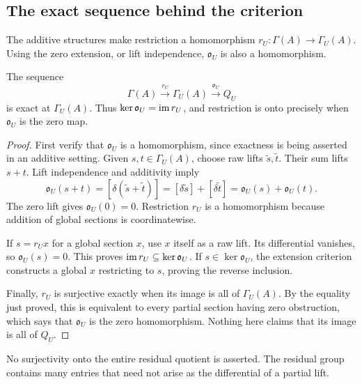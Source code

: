 \subsection{The exact sequence behind the criterion}
The additive structures make restriction a homomorphism
\(r_U:\Gamma(A)\to\Gamma_U(A)\). Using the zero extension, or lift independence, \(\mathfrak o_U\) is also a homomorphism.

\begin{proposition}\label{KS12}
The sequence
\[
 \Gamma(A)\xrightarrow{r_U}\Gamma_U(A)
 \xrightarrow{\mathfrak o_U}Q_U
\]
is exact at \(\Gamma_U(A)\). Thus \(\ker\mathfrak o_U=\operatorname{im} r_U\), and restriction is onto precisely when \(\mathfrak o_U\) is the zero map.
\end{proposition}
\begin{proof}
First verify that $\mathfrak o_U$ is a homomorphism, since exactness is being asserted in an additive setting. Given $s,t\in\Gamma_U(A)$, choose raw lifts $\widetilde s,\widetilde t$. Their sum lifts $s+t$. Lift independence and additivity imply
\[
 \mathfrak o_U(s+t)
 =[\delta(\widetilde s+\widetilde t)]
 =[\delta\widetilde s]+[\delta\widetilde t]
 =\mathfrak o_U(s)+\mathfrak o_U(t).
\]
The zero lift gives $\mathfrak o_U(0)=0$. Restriction $r_U$ is a homomorphism because addition of global sections is coordinatewise.

If $s=r_Ux$ for a global section $x$, use $x$ itself as a raw lift. Its differential vanishes, so $\mathfrak o_U(s)=0$. This proves $\operatorname{im} r_U\subseteq\ker\mathfrak o_U$. If $s\in\ker\mathfrak o_U$, the extension criterion constructs a global $x$ restricting to $s$, proving the reverse inclusion.

Finally, $r_U$ is surjective exactly when its image is all of $\Gamma_U(A)$. By the equality just proved, this is equivalent to every partial section having zero obstruction, which says that $\mathfrak o_U$ is the zero homomorphism. Nothing here claims that its image is all of $Q_U$.
\end{proof}
No surjectivity onto the entire residual quotient is asserted. The residual group contains many entries that need not arise as the differential of a partial lift.

